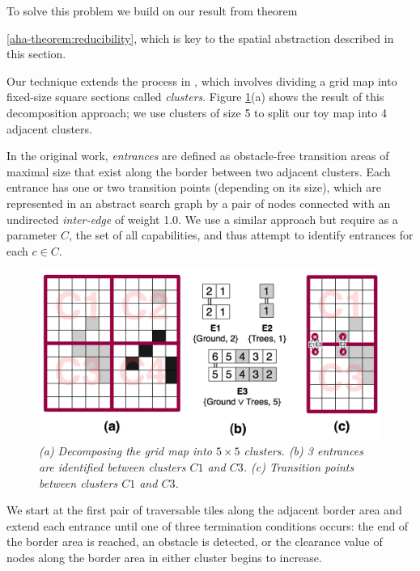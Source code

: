 To solve this problem we build on our result from theorem {\ref{aha-theorem:reducibility}, which is key to the spatial abstraction described in this section.
\par \indent
Our technique extends the process in \cite{botea04}, which involves dividing a grid map into fixed-size square sections called \emph{clusters}. 
Figure \ref{aha-fig:clustersandentrances}(a) shows the result of this decomposition approach; we use clusters of size 5 to split our toy map into 4 adjacent clusters. 
\par \indent
In the original work, \emph{entrances} are defined as obstacle-free transition areas of maximal size that exist along the border between two adjacent clusters.
Each entrance has one or two transition points (depending on its size), which are represented in an abstract search graph by a pair of nodes connected with an undirected \emph{inter-edge} of weight 1.0. 
We use a similar approach but require as a parameter $C$, the set of all capabilities, and thus attempt to identify entrances for each $c \in C$. 
\begin{figure}[htbp]
	\vspace{-9pt}
        \caption{\emph{(a) Decomposing the grid map into $5 \times 5$ clusters. (b) 3 entrances are identified between clusters $C1$ and $C3$. (c) Transition points between clusters $C1$ and $C3$.} \vspace{0.5em} }
        \begin{center}
                        \includegraphics[scale=0.30, trim = 20mm 0mm 20mm 0mm]{diagrams/identifying_entrances.png}
        \end{center}
        \label{aha-fig:clustersandentrances}
	\vspace{-9pt}
\end{figure}
\par \indent
We start at the first pair of traversable tiles along the adjacent border area and extend each entrance until one of three termination conditions occurs: the end of the border area is reached, an obstacle is detected, or the clearance value of nodes along the border area in either cluster begins to increase. 
}
